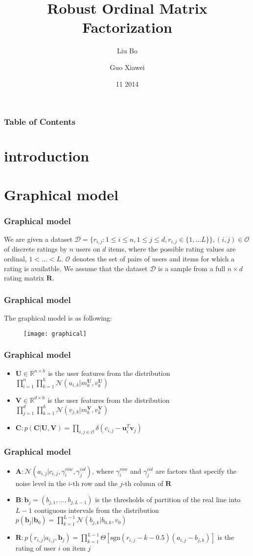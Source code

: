 \documentclass{beamer}
\newcommand{\vect}[1]{\boldsymbol{\mathbf{#1}}} %
\newcommand{\vb}{\vect{b}}
\newcommand{\vB}{\vect{B}}
\newcommand{\vC}{\vect{C}}
\newcommand{\vU}{\vect{U}}
\newcommand{\vV}{\vect{V}}
\newcommand{\vu}{\vect{u}}
\newcommand{\vv}{\vect{v}}
\newcommand{\vR}{\vect{R}}
\newcommand{\vA}{\vect{A}}
\newcommand{\bR}{\mathbb{R}}
\newcommand{\mN}{\mathcal{N}}
\newcommand{\mO}{\mathcal{O}}
\begin{document}
 \title{Robust Ordinal Matrix Factorization}
 \author{Liu Bo \and  Guo Xiawei}
 \date{11 2014}
\frame{\titlepage}
\begin{frame}
    \frametitle{Table of Contents}
    \tableofcontents
\end{frame}
\section{introduction}
\section{Graphical model}
\begin{frame}
    \frametitle{Graphical model}
    We are given a dataset $\mathcal{D} = \{r_{i,j}: 1\le i \le n, 1\le j\le d, r_{i,j} \in \{1,\dots L\}\},(i,j)\in \mO $ of discrete ratings by $n$ users on $d$ items, where the possible rating values are ordinal, $1<\dots<L$. $\mO$ denotes the set of pairs of users and items for which a rating is availatble. We assume that the dataset $\mathcal{D}$ is a sample from a full $n\times d$ rating matrix $\vR$.
\end{frame}
\begin{frame}
    \frametitle{Graphical model}
    The graphical model is as following:
    \begin{figure}
	\centering
	\texttt{[image: graphical]}
    \end{figure}
\end{frame}
\begin{frame}
    \frametitle{Graphical model}
\begin{itemize}
    \item $\vU \in \bR^{n\times h}$  is the user features from the distribution $\prod_{i=1}^n\prod_{k=1}^h\mN(u_{i,k}|m_k^{\vU}, v_k^{\vU})$
    \item $\vV \in \bR^{d\times h}$  is the user features from the distribution $\prod_{j=1}^d\prod_{k=1}^h\mN(v_{j,k}|m_k^{\vV}, v_k^{\vV})$
    \item $\vC: p(\vC|\vU, \vV) = \prod_{i,j \in \mO}\delta(c_{i,j} - \vu_i^T \vv_j) $
\end{itemize}
\end{frame}
\begin{frame}
    \frametitle{Graphical model}
    \begin{itemize}
    \item $\vA: \mN(a_{i,j}|c_{i,j}, \gamma_i^{row}, \gamma_j^{col})$, where $\gamma_i^{row}$ and $\gamma_j^{col}$ are factors that specify the noise level in the $i$-th row and the $j$-th column of $\vR$
    \item $\vB: \vb_j = (b_{j,1},\dots ,b_{j,L-1})$ is the thresholds of partition of the real line into $L-1$ contiguous intervals from the distribution $p(\vb_j|\vb_0) = \prod^{L-1}_{k=1}\mN(b_{j,k}|b_{0,k}, v_0)$
    \item $\vR: p(r_{i,j}|a_{i,j}, \vb_j) = \prod^{L-1}_{k=1}\Theta[\text{sgn}(r_{i,j}-k-0.5)(a_{i,j} - b_{j,k})]$ is the rating of user $i$ on item $j$
\end{itemize}
\end{frame}
\end{document}
